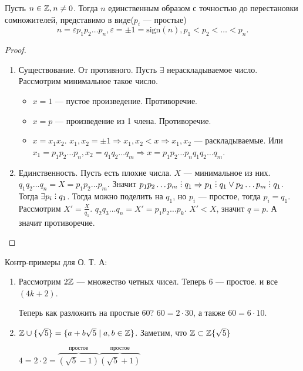 \begin{theorem}
    Пусть $n \in \mathbb{Z}, n \neq 0$. Тогда  $n$ единственным образом с точностью до перестановки сомножителей, представимо в виде($p_i$ --- простые)  \[
        n = \varepsilon p_1p_2\ldots p_n, \varepsilon = \pm 1 = \text{sign}(n), p_1 < p_2 < \ldots < p_n
    .\] 
\end{theorem}
\begin{proof}
    \slashn
\begin{enumerate}
    \item Существование. От противного. Пусть $\exists$ нераскладываемое число. Рассмотрим минимальное такое число.
        \begin{itemize}
            \item $x = 1$ --- пустое произведение. Противоречие.
            \item  $x = p$ --- произведение из 1 члена. Противоречие.
            \item  $x = x_1x_2$. $x_1,x_2 = \pm 1 \Rightarrow x_1, x_2 < x \Rightarrow x_1, x_2$ --- раскладываемые. Или $x_1 = p_1 p_2\ldots p_n, x_2 = q_1 q_2 \ldots q_m \Rightarrow x = p_1 p_2 \ldots p_n q_1 q_2 \ldots q_m$.
        \end{itemize}
    \item Единственность. Пусть есть плохие числа. $X$ --- минимальное из них.  $q_1 q_2 \ldots q_n = X = p_1 p_2 \ldots p_m$. Значит $p_1 p_2 \ldots p_m \divby q_1 \Rightarrow p_1 \divby q_1 \lor p_2\ldots p_m \divby q_1$. Тогда $\exists p_i \divby q_1$. Тогда можно поделить на  $q_1$, но $p_i$ --- простое, тогда  $p_i = q_1$. Рассмотрим  $X' = \frac{X}{q_1}$. $q_2 q_3 \ldots q_n = X' = p_1 p_2 \ldots p_k$. $X' < X$, значит  $q = p$. А значит противоречие. 
\end{enumerate}
\end{proof}
Контр-примеры для О. Т. А:
\begin{enumerate}
    \item Рассмотрим $2\mathbb{Z}$ --- множество четных чисел. Теперь 6 --- простое. и все $(4k + 2)$.

        Теперь как разложить на простые 60?  $60 = 2 \cdot 30$, а также  $60 = 6 \cdot 10$.
    \item $\mathbb{Z} \cup \{\sqrt{5}\} = \{ a + b\sqrt{5} \mid a,b \in \mathbb{Z}\}$. Заметим, что  $\mathbb{Z} \subset \mathbb{Z}\{\sqrt{5}\}$

        $4 = 2 \cdot 2 = \overbrace{(\sqrt{5} - 1)}^{\text{простое}}\overbrace{(\sqrt{5} + 1)}^{\text{простое}}$
\end{enumerate}
